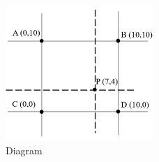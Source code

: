 \documentclass[journal,12pt,onecolumn]{IEEEtran}
\begin{document}
\begin{figure}[h] 
    \centering
    \includegraphics[width=0.5\textwidth]{figs/qn84.png}
    \caption{Diagram}
\label{fig:qn84}
\end{figure}
\end{document}
